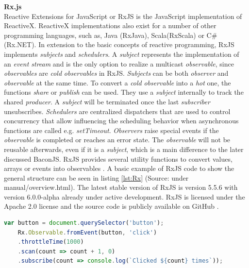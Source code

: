 	\textbf{Rx.js}\\
	Reactive Extensions for JavaScript or RxJS \cite{RxJS} is the JavaScript implementation of ReactiveX. ReactiveX implementations also exist for a number of other programming languages, such as, Java (RxJava), Scala(RxScala) or C\#(Rx.NET). In extension to the basic concepts of reactive programming, RxJS implements \emph{subjects} and \emph{schedulers}. A \emph{subject} represents the implementation of an \emph{event stream} and is the only option to realize a multicast \emph{observable}, since \emph{observables} are \emph{cold} \emph{observables} in RxJS. \emph{Subjects} can be both \emph{observer} and \emph{observable} at the same time. To convert a \emph{cold} \emph{observable} into a \emph{hot} one, the functions \emph{share} or \emph{publish} can be used. They use a \emph{subject} internally to track the shared \emph{producer}. A \emph{subject} will be terminated once the last \emph{subscriber} unsubscribes. \emph{Schedulers} are centralized dispatchers that are used to control concurrency that allow influencing the scheduling behavior when asynchronous functions are called e.g. \emph{setTimeout}\cite{RxJsDocu}. %
	\emph{Observers} raise special events if the \emph{observable} is completed or reaches an error state. The \emph{observable} will not be reusable afterwards, even if it is a \emph{subject}, which is a main difference to the later discussed BaconJS. RxJS provides several utility functions to convert values, arrays or events into observables \cite{ThesisBaradur}. A basic example of RxJS code to show the general structure can be seen in listing \ref{lst:Rx} (Source: \cite{RxJsDocu} under manual/overview.html).
	The latest stable version of RxJS is version 5.5.6 with version 6.0.0-alpha already under active development. RxJS is licensed under the Apache 2.0 license and the source code is publicly available on GitHub \cite{RxJSRepo}.

	\begin{lstlisting}[language=JavaScript, caption={Example of RxJS code.},label={lst:Rx}]
	var button = document.querySelector('button');
	Rx.Observable.fromEvent(button, 'click')
	.throttleTime(1000)
	.scan(count => count + 1, 0)
	.subscribe(count => console.log(`Clicked ${count} times`));
	\end{lstlisting}
	
